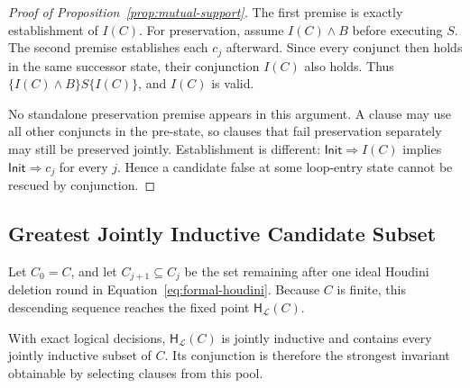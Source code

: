 \begin{proof}[Proof of Proposition~\ref{prop:mutual-support}]
The first premise is exactly establishment of \(I(C)\).  For preservation,
assume \(I(C)\wedge B\) before executing \(S\).  The second premise establishes
each \(c_j\) afterward.  Since every conjunct then holds in the same successor
state, their conjunction \(I(C)\) also holds.  Thus
\(\{I(C)\wedge B\}S\{I(C)\}\), and \(I(C)\) is valid.

No standalone preservation premise appears in this argument.  A clause may
use all other conjuncts in the pre-state, so clauses that fail preservation
separately may still be preserved jointly.  Establishment is different:
\(\mathsf{Init}\Rightarrow I(C)\) implies \(\mathsf{Init}\Rightarrow c_j\) for every \(j\).  Hence a
candidate false at some loop-entry state cannot be rescued by conjunction.
\end{proof}

\subsection{Greatest Jointly Inductive Candidate Subset}

Let \(C_0=C\), and let \(C_{j+1}\subseteq C_j\) be the set remaining after one
ideal Houdini deletion round in Equation~\eqref{eq:formal-houdini}.  Because \(C\) is
finite, this descending sequence reaches the fixed point
\(\mathsf H_{\mathcal L}(C)\).

\begin{theorem}
\label{thm:houdini-greatest}
With exact logical decisions, \(\mathsf H_{\mathcal L}(C)\) is jointly
inductive and contains every jointly inductive subset of \(C\).  Its
conjunction is therefore the strongest invariant obtainable by selecting
clauses from this pool.
\end{theorem}

